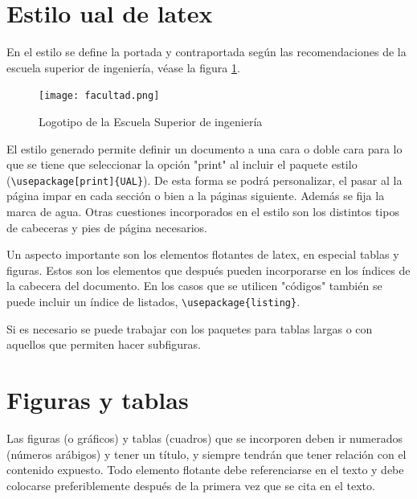 \section {Estilo ual de latex}

En el estilo se define la portada y contraportada según las recomendaciones de la escuela superior de ingeniería, véase la figura \ref{fig:facultad}.

\begin{figure}
	\begin{center}
		\texttt{[image: facultad.png]}
	\end{center}
	\caption{\label{fig:facultad} Logotipo de la Escuela Superior de ingeniería }
\end{figure}



El estilo generado permite definir un documento a una cara o doble cara para lo que se tiene que seleccionar la opción "print" al incluir el paquete estilo (\lstinline[language=enparrafo]!\usepackage[print]{UAL}!). De esta forma se podrá personalizar, el pasar al la página impar en cada sección o bien a la páginas siguiente. %
Además se fija la marca de agua. Otras cuestiones incorporados en el estilo son los distintos tipos de cabeceras y pies de página necesarios.

Un aspecto importante son los elementos flotantes de latex, en especial tablas y figuras. Estos son los elementos que después pueden incorporarse en los índices de la cabecera del documento. En los casos que se utilicen "códigos" también se puede incluir un índice de listados, \lstinline[language=enparrafo]!\usepackage{listing}!.

Si es necesario se puede trabajar con los paquetes para tablas largas o con aquellos que permiten hacer subfiguras.

 \section{Figuras y tablas}

Las  figuras  (o  gráficos)  y  tablas  (cuadros)  que  se  incorporen  deben  ir  numerados  (números  arábigos)  y  tener  un  título,  y  siempre  tendrán  que  tener  relación  con el contenido expuesto.  Todo elemento flotante debe referenciarse en el texto y debe colocarse  preferiblemente después de la primera vez que se cita en el texto.

